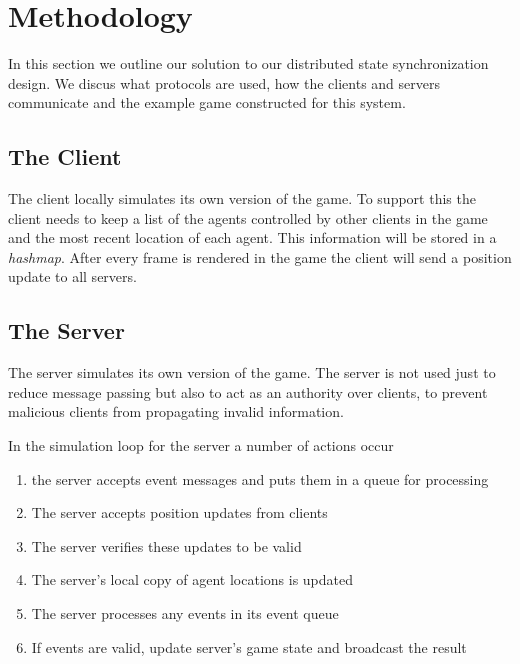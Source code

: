 
\section{Methodology}
\label{sec:methodology}



	In this section we outline our solution to our distributed state synchronization design. We discus what protocols are used, how the clients and servers communicate and the example game constructed for this system.
	
\subsection{The Client}

	The client locally simulates its own version of the game. To support this the client needs to keep a list of the agents controlled by other clients in the game and the most recent location of each agent. This information will be stored in a \emph{hashmap}. After every frame is rendered in the game the client will send a position update to all servers.
	
\subsection{The Server}

	The server simulates its own version of the game. The server is not used just to reduce message passing but also to act as an authority over clients, to prevent malicious clients from propagating invalid information.
	
	In the simulation loop for the server a number of actions occur
	\begin{enumerate}[topsep=2pt,itemsep=-1ex,partopsep=1ex,parsep=1ex]
		\item the server accepts event messages and puts them in a queue for processing
		\item The server accepts position updates from clients
		\item The server verifies these updates to be valid
		\item The server's local copy of agent locations is updated
		\item The server processes any events in its event queue
		\item If events are valid, update server's game state and broadcast the result
	\end{enumerate}
	
